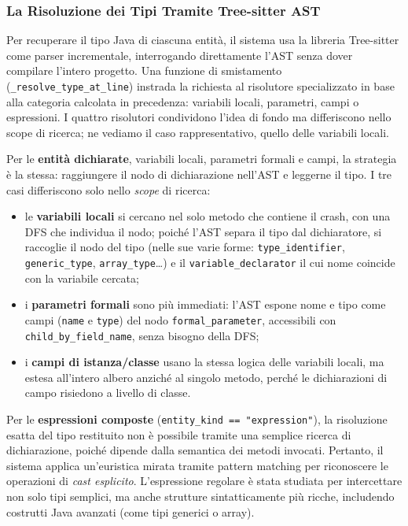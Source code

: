 \subsubsection{La Risoluzione dei Tipi Tramite Tree-sitter AST}
Per recuperare il tipo Java di ciascuna entità, il sistema usa la libreria Tree-sitter come parser
incrementale, interrogando direttamente l'AST senza dover compilare l'intero progetto. Una funzione di
smistamento (\texttt{\_resolve\_type\_at\_line}) instrada la richiesta al risolutore specializzato in base alla
categoria calcolata in precedenza: variabili locali, parametri, campi o espressioni. I quattro risolutori
condividono l'idea di fondo ma differiscono nello scope di ricerca; ne vediamo il caso rappresentativo, quello
delle variabili locali.

Per le \textbf{entità dichiarate}, variabili locali, parametri formali e campi, la strategia è la stessa:
raggiungere il nodo di dichiarazione nell'AST e leggerne il tipo. I tre casi differiscono solo nello
\emph{scope} di ricerca:
\begin{itemize}
    \item le \textbf{variabili locali} si cercano nel solo metodo che contiene il crash, con una DFS che individua il nodo; 
    poiché l'AST separa il tipo dal dichiaratore, si raccoglie il nodo del
    tipo (nelle sue varie forme: \texttt{type\_identifier}, \texttt{generic\_type}, \texttt{array\_type}\dots) e
    il \texttt{variable\_declarator} il cui nome coincide con la variabile cercata;
    \item i \textbf{parametri formali} sono più immediati: l'AST espone nome e tipo come campi (\texttt{name} e
    \texttt{type}) del nodo \texttt{formal\_parameter}, accessibili con \texttt{child\_by\_field\_name}, senza
    bisogno della DFS;
    \item i \textbf{campi di istanza/classe} usano la stessa logica delle variabili locali, ma estesa all'intero
    albero anziché al singolo metodo, perché le dichiarazioni di campo risiedono a livello di classe.
\end{itemize}

Per le \textbf{espressioni composte} (\texttt{entity\_kind == "expression"}), la risoluzione esatta del tipo restituito 
non è possibile tramite una semplice ricerca di dichiarazione, poiché dipende dalla semantica dei metodi invocati. 
Pertanto, il sistema applica un'euristica mirata tramite pattern matching per riconoscere le operazioni di 
\textit{cast esplicito}. L'espressione regolare è stata studiata per intercettare non solo tipi semplici, 
ma anche strutture sintatticamente più ricche, includendo costrutti Java avanzati (come tipi generici o array).

